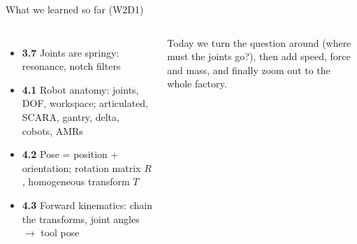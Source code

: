 \documentclass[aspectratio=169,10pt]{beamer}
\begin{document}
\begin{frame}[t]{What we learned so far (W2D1)}
\begin{columns}[T,onlytextwidth]
\begin{itemize}\small
\item \textbf{3.7} Joints are springy: resonance, notch filters
\item \textbf{4.1} Robot anatomy: joints, DOF, workspace; articulated, SCARA, gantry, delta, cobots, AMRs
\item \textbf{4.2} Pose = position + orientation; rotation matrix $R$, homogeneous transform $T$
\item \textbf{4.3} Forward kinematics: chain the transforms, joint angles $\rightarrow$ tool pose
\end{itemize}
\begin{notebox}
Today we turn the question around (where must the joints go?), then add speed, force and
mass, and finally zoom out to the whole factory.
\end{notebox}
\centering
{}
\end{columns}
\end{frame}
\end{document}

